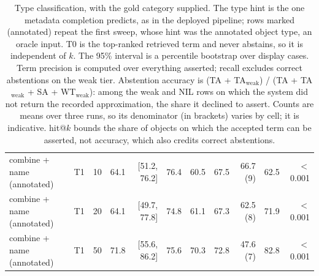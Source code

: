 \begin{table}[t]
\begin{tabular}{lrrrrrrrrrr}
combine + name (annotated) & T1 & 10 & 64.1 & [51.2, 76.2] & 76.4 & 60.5 & 67.5 & 66.7 (9) & 62.5 & $<$0.001 \\
combine + name (annotated) & T1 & 20 & 64.1 & [49.7, 77.8] & 74.8 & 61.1 & 67.3 & 62.5 (8) & 71.9 & $<$0.001 \\
combine + name (annotated) & T1 & 50 & 71.8 & [55.6, 86.2] & 75.6 & 70.3 & 72.8 & 47.6 (7) & 82.8 & $<$0.001 \\
\bottomrule
\end{tabular}
\caption{Type classification, with the gold category supplied. The type hint is the one metadata completion predicts, as in the deployed pipeline; rows marked (annotated) repeat the first sweep, whose hint was the annotated object type, an oracle input. T0 is the top-ranked retrieved term and never abstains, so it is independent of $k$. The 95\% interval is a percentile bootstrap over display cases. Term precision is computed over everything asserted; recall excludes correct abstentions on the weak tier. Abstention accuracy is (TA + TA$_\mathrm{weak}$) / (TA + TA$_\mathrm{weak}$ + SA + WT$_\mathrm{weak}$): among the weak and NIL rows on which the system did not return the recorded approximation, the share it declined to assert. Counts are means over three runs, so its denominator (in brackets) varies by cell; it is indicative. hit@$k$ bounds the share of objects on which the accepted term can be asserted, not accuracy, which also credits correct abstentions.}
\label{tab:type}
\end{table}
